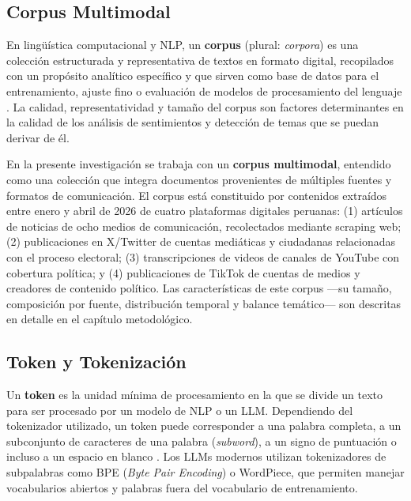 \subsection{Corpus Multimodal}

En lingüística computacional y NLP, un \textbf{corpus} (plural: \textit{corpora}) es una colección estructurada y representativa de textos en formato digital, recopilados con un propósito analítico específico y que sirven como base de datos para el entrenamiento, ajuste fino o evaluación de modelos de procesamiento del lenguaje \parencite{mc_manning1999foundations}. La calidad, representatividad y tamaño del corpus son factores determinantes en la calidad de los análisis de sentimientos y detección de temas que se puedan derivar de él.

En la presente investigación se trabaja con un \textbf{corpus multimodal}, entendido como una colección que integra documentos provenientes de múltiples fuentes y formatos de comunicación. El corpus está constituido por contenidos extraídos entre enero y abril de 2026 de cuatro plataformas digitales peruanas: (1) artículos de noticias de ocho medios de comunicación, recolectados mediante scraping web; (2) publicaciones en X/Twitter de cuentas mediáticas y ciudadanas relacionadas con el proceso electoral; (3) transcripciones de videos de canales de YouTube con cobertura política; y (4) publicaciones de TikTok de cuentas de medios y creadores de contenido político. Las características de este corpus —su tamaño, composición por fuente, distribución temporal y balance temático— son descritas en detalle en el capítulo metodológico.

\subsection{Token y Tokenización}

Un \textbf{token} es la unidad mínima de procesamiento en la que se divide un texto para ser procesado por un modelo de NLP o un LLM. Dependiendo del tokenizador utilizado, un token puede corresponder a una palabra completa, a un subconjunto de caracteres de una palabra (\textit{subword}), a un signo de puntuación o incluso a un espacio en blanco \parencite{tec_devlin2018bert}. Los LLMs modernos utilizan tokenizadores de subpalabras como BPE (\textit{Byte Pair Encoding}) o WordPiece, que permiten manejar vocabularios abiertos y palabras fuera del vocabulario de entrenamiento.


